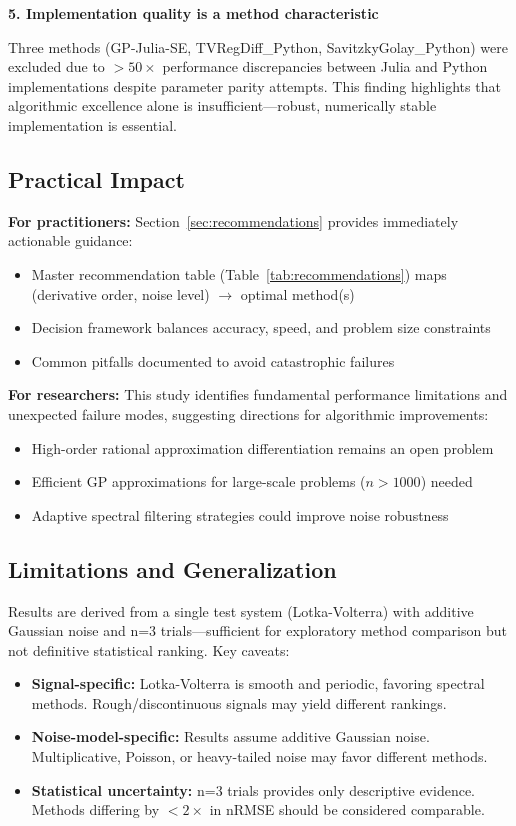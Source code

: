 \textbf{5. Implementation quality is a method characteristic}

Three methods (GP-Julia-SE, TVRegDiff\_Python, SavitzkyGolay\_Python) were excluded due to $> 50\times$ performance discrepancies between Julia and Python implementations despite parameter parity attempts. This finding highlights that algorithmic excellence alone is insufficient—robust, numerically stable implementation is essential.

\subsection{Practical Impact}

\textbf{For practitioners:} Section~\ref{sec:recommendations} provides immediately actionable guidance:
\begin{itemize}
    \item Master recommendation table (Table~\ref{tab:recommendations}) maps (derivative order, noise level) $\to$ optimal method(s)
    \item Decision framework balances accuracy, speed, and problem size constraints
    \item Common pitfalls documented to avoid catastrophic failures
\end{itemize}

\textbf{For researchers:} This study identifies fundamental performance limitations and unexpected failure modes, suggesting directions for algorithmic improvements:
\begin{itemize}
    \item High-order rational approximation differentiation remains an open problem
    \item Efficient GP approximations for large-scale problems ($n > 1000$) needed
    \item Adaptive spectral filtering strategies could improve noise robustness
\end{itemize}

\subsection{Limitations and Generalization}

Results are derived from a single test system (Lotka-Volterra) with additive Gaussian noise and n=3 trials—sufficient for exploratory method comparison but not definitive statistical ranking. Key caveats:

\begin{itemize}
    \item \textbf{Signal-specific:} Lotka-Volterra is smooth and periodic, favoring spectral methods. Rough/discontinuous signals may yield different rankings.
    \item \textbf{Noise-model-specific:} Results assume additive Gaussian noise. Multiplicative, Poisson, or heavy-tailed noise may favor different methods.
    \item \textbf{Statistical uncertainty:} n=3 trials provides only descriptive evidence. Methods differing by $<2\times$ in nRMSE should be considered comparable.
\end{itemize}

